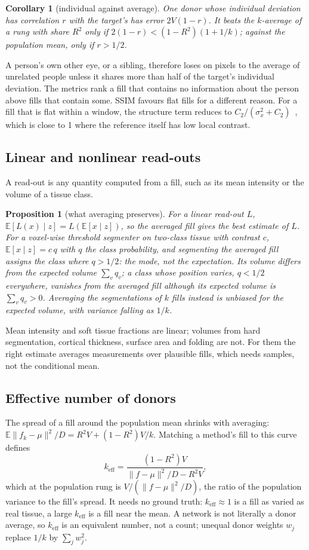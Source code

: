 \documentclass{article}
\newtheorem{prop}{Proposition}
\newtheorem{cor}{Corollary}
\begin{document}
\begin{cor}[individual against average]
One donor whose individual deviation has correlation $r$ with the target's has error $2V(1-r)$.
It beats the $k$-average of a rung with share $R^2$ only if $2(1-r)<(1-R^2)(1+1/k)$; against the population mean, only if $r>1/2$.
\end{cor}
\noindent A person's own other eye, or a sibling, therefore loses on pixels to the average of unrelated people unless it shares more than half of the target's individual deviation.
The metrics rank a fill that contains no information about the person above fills that contain some.
SSIM favours flat fills for a different reason.
For a fill that is flat within a window, the structure term reduces to $C_2/(\sigma_x^2+C_2)$~\cite{wang2004}, which is close to 1 where the reference itself has low local contrast.

\subsection{Linear and nonlinear read-outs}
A read-out is any quantity computed from a fill, such as its mean intensity or the volume of a tissue class.
\begin{prop}[what averaging preserves]
For a linear read-out $L$, $\mathbb{E}[L(x)\mid z]=L(\mathbb{E}[x\mid z])$, so the averaged fill gives the best estimate of $L$.
For a voxel-wise threshold segmenter on two-class tissue with contrast $c$, $\mathbb{E}[x\mid z]=c\,q$ with $q$ the class probability, and segmenting the averaged fill assigns the class where $q>1/2$: the mode, not the expectation.
Its volume differs from the expected volume $\sum_v q_v$; a class whose position varies, $q<1/2$ everywhere, vanishes from the averaged fill although its expected volume is $\sum_v q_v>0$.
Averaging the segmentations of $k$ fills instead is unbiased for the expected volume, with variance falling as $1/k$.
\end{prop}
\noindent Mean intensity and soft tissue fractions are linear; volumes from hard segmentation, cortical thickness, surface area and folding are not.
For them the right estimate averages measurements over plausible fills, which needs samples, not the conditional mean.

\subsection{Effective number of donors}
The spread of a fill around the population mean shrinks with averaging: $\mathbb{E}\|f_k-\mu\|^2/D=R^2V+(1-R^2)V/k$.
Matching a method's fill to this curve defines
\begin{equation}
k_{\mathrm{eff}}=\frac{(1-R^2)V}{\|f-\mu\|^2/D-R^2V},
\label{eq:keff}
\end{equation}
which at the population rung is $V/(\|f-\mu\|^2/D)$, the ratio of the population variance to the fill's spread.
It needs no ground truth: $k_{\mathrm{eff}}\approx1$ is a fill as varied as real tissue, a large $k_{\mathrm{eff}}$ is a fill near the mean.
A network is not literally a donor average, so $k_{\mathrm{eff}}$ is an equivalent number, not a count; unequal donor weights $w_j$ replace $1/k$ by $\sum_j w_j^2$.
\end{document}
